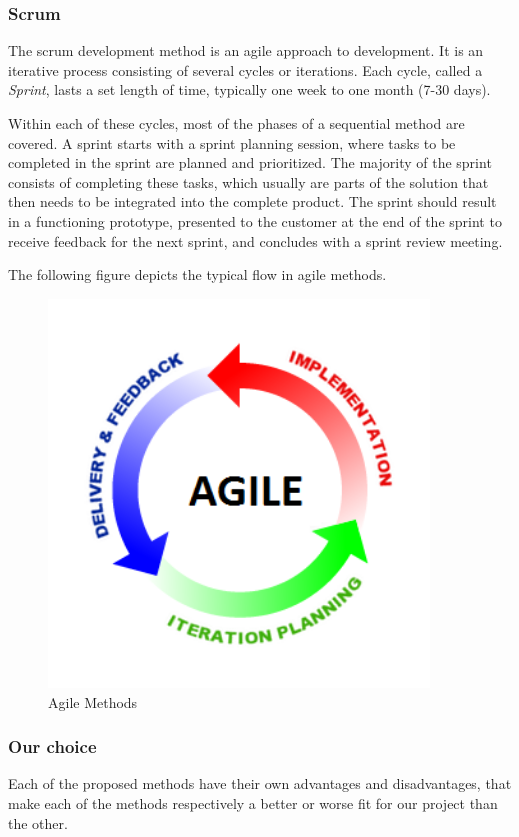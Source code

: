 \newpage
\subsubsection{Scrum}
The scrum development method is an agile approach to development. It is an iterative process consisting of several cycles or iterations. Each cycle, called a \emph{Sprint}, lasts a set length of time, typically one week to one month (7-30 days).

Within each of these cycles, most of the phases of a sequential method are covered. A sprint starts with a sprint planning session, where tasks to be completed in the sprint are planned and prioritized. The majority of the sprint consists of completing these tasks, which usually are parts of the solution that then needs to be integrated into the complete product. The sprint should result in a functioning prototype, presented to the customer at the end of the sprint to receive feedback for the next sprint, and concludes with a sprint review meeting.

The following figure depicts the typical flow in agile methods.

\begin{figure}[H]
\centering
\includegraphics[width=0.9\textwidth]{images/agile-methods.png}
\caption{Agile Methods \cite{agileModel}}
\label{fig:agile_model}
\end{figure}

\subsubsection{Our choice}
Each of the proposed methods have their own advantages and disadvantages, that make each of the methods respectively a better or worse fit for our project than the other.

